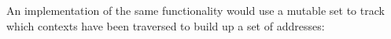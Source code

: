 An implementation of the same functionality would use a mutable set to track which contexts have been traversed to build up a set of addresses:

